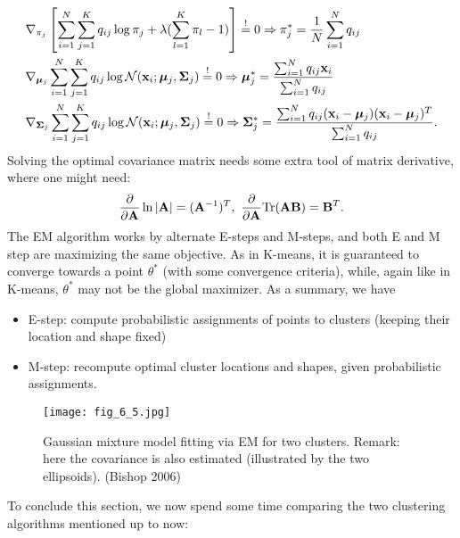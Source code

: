 \documentclass[../book-template.tex]{subfiles}
\begin{document}
\begin{align*}
	&\nabla_{\pi_j}\left[\sum_{i=1}^{N}\sum_{j=1}^{K}q_{ij}\log \pi_j +\lambda(\sum_{l=1}^{K} \pi_l-1)\right]\overset{!}{=}0\Rightarrow \pi_j^* =\frac{1}{N}\sum_{i=1}^{N}q_{ij}\\
	&\nabla_{\bm{\mu}_j}\sum_{i=1}^{N}\sum_{j=1}^{K}q_{ij}\log \mathcal{N}({\bf x}_i;\bm{\mu}_j,{\bf \Sigma}_j) \overset{!}{=}0\Rightarrow \bm{\mu}_j^*=\frac{\sum_{i=1}^{N}q_{ij}{\bf x}_i}{\sum_{i=1}^{N}q_{ij}}\\
	&\nabla_{\bm{\Sigma}_j}\sum_{i=1}^{N}\sum_{j=1}^{K}q_{ij}\log \mathcal{N}({\bf x}_i;\bm{\mu}_j,{\bf \Sigma}_j) \overset{!}{=}0\Rightarrow \bm{\Sigma}_j^*=\frac{\sum_{i=1}^{N}q_{ij}({\bf x}_i-\bm{\mu}_j)({\bf x}_i-\bm{\mu}_j)^T}{\sum_{i=1}^{N}q_{ij}}.
\end{align*}
Solving the optimal covariance matrix needs some extra tool of matrix derivative, where one might need:
\begin{equation*}
	\frac{\partial}{\partial {\bf A}}\ln |{\bf A}|=({\bf A}^{-1})^T,\ \frac{\partial}{\partial {\bf A}} {\rm Tr}({\bf AB})={\bf B}^T.
\end{equation*}
The EM algorithm works by alternate E-steps and M-steps, and both E and M step are maximizing the same objective. As in K-means, it is guaranteed to converge towards a point $\theta^*$ (with some convergence criteria), while, again like in K-means, $\theta^*$ may not be the global maximizer. As a summary, we have
\begin{itemize}
	\item E-step: compute probabilistic assignments of points to clusters (keeping their location and shape fixed)
	\item M-step: recompute optimal cluster locations and shapes, given probabilistic assignments.
\end{itemize}
\begin{figure}[h] 
	\centering 
	\texttt{[image: fig\_6\_5.jpg]} 
	\caption{Gaussian mixture model fitting via EM for two clusters. Remark: here the covariance is also estimated (illustrated by the two ellipsoids). (Bishop 2006)}\label{fig_6_5}
\end{figure}
To conclude this section, we now spend some time comparing the two clustering algorithms mentioned up to now:
\end{document}
